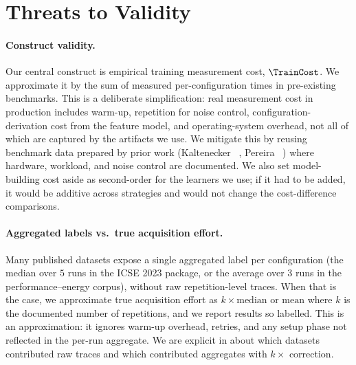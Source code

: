 \section{Threats to Validity}
\label{sec:threats}

\paragraph*{Construct validity.}
Our central construct is empirical training measurement cost,
$\TrainCost$. We approximate it by the sum of measured per-configuration
times in pre-existing benchmarks. This is a deliberate simplification:
real measurement cost in production includes warm-up, repetition for noise
control, configuration-derivation cost from the feature model, and
operating-system overhead, not all of which are captured by the artifacts
we use. We mitigate this by reusing benchmark data prepared by prior work
(Kaltenecker \etal~\cite{kaltenecker2019}, Pereira
\etal~\cite{pereira2020}) where hardware, workload, and noise control are
documented. We also set model-building cost aside as second-order for the
learners we use; if it had to be added, it would be additive across
strategies and would not change the cost-difference comparisons.

\paragraph*{Aggregated labels vs.\ true acquisition effort.}
Many published datasets expose a single aggregated label per configuration
(\eg the median over $5$ runs in the \dsWLI ICSE 2023 package, or
the average over $3$ runs in the performance--energy corpus), without raw
repetition-level traces. When that is the case, we approximate true
acquisition effort as $k\times\text{median or mean}$ where $k$ is the
documented number of repetitions, and we report results so labelled. This
is an approximation: it ignores warm-up overhead, retries, and any setup
phase not reflected in the per-run aggregate. We are explicit in
 about which datasets contributed raw traces and which
contributed aggregates with $k\times$ correction.

